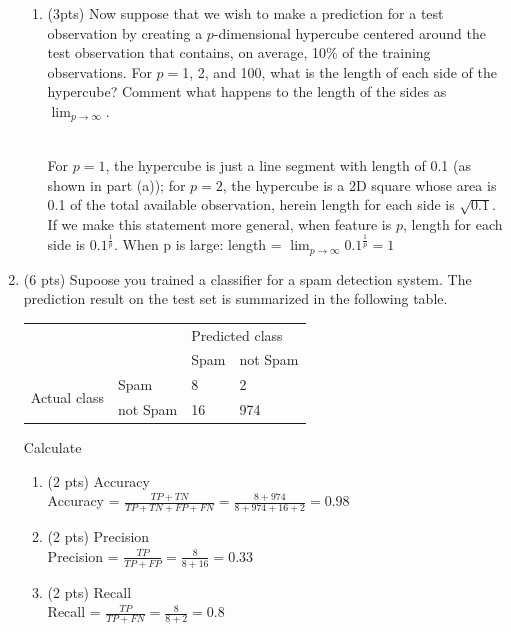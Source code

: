 \documentclass[a4paper]{article}
\theoremstyle{definition}
\newenvironment{soln}{
    \leavevmode\color{blue}\ignorespaces
}{}
\begin{document}
\begin{enumerate}
\begin{enumerate}
	\item (3pts) Now suppose that we wish to make a prediction for a test observation by creating a $p$-dimensional hypercube centered around the test observation that contains, on average, 10\% of the training observations. For $p =$1, 2, and 100, what is the length of each side of the hypercube? Comment what happens to the length of the sides as $\lim_{{p \to \infty}}$.
	
	\begin{soln}\\
	For $p=1$, the hypercube is just a line segment with length of 0.1 (as shown in part (a)); for $p=2$, the hypercube is a 2D square whose area is 0.1 of the total available observation, herein length for each side is $\sqrt{0.1}$. If we make this statement more general, when feature is $p$, length for each side is $0.1^{\frac{1}{p}}$. When p is large: length = $\lim_{{p \to \infty}} 0.1^{\frac{1}{p}} = 1$\\
	\end{soln}
	
\end{enumerate}

\item (6 pts) Supoose you trained a classifier for a spam detection system. The prediction result on the test set is summarized in the following table.
\begin{center}
	\begin{tabular}{l l | l l}
		&          & \multicolumn{2}{l}{Predicted class} \\
		&          & Spam           & not Spam           \\
		\hline
		\multirow{2}{*}{Actual class} & Spam     & 8              & 2                  \\
		& not Spam & 16             & 974               
	\end{tabular}
\end{center}

Calculate
\begin{enumerate}
	\item (2 pts) Accuracy
	\begin{soln}\\
	Accuracy = $\frac{TP + TN}{TP + TN + FP + FN} = \frac{8 + 974}{8 + 974 + 16 + 2} = 0.98$
	\end{soln}
	\item (2 pts) Precision
	\begin{soln}\\
	Precision = $\frac{TP}{TP + FP} = \frac{8}{8 + 16} = 0.33$
	\end{soln}
	\item (2 pts) Recall
	\begin{soln}\\
	Recall = $\frac{TP}{TP + FN} = \frac{8}{8 + 2} = 0.8$
	\end{soln}
\end{enumerate}



\end{enumerate}
\end{document}
